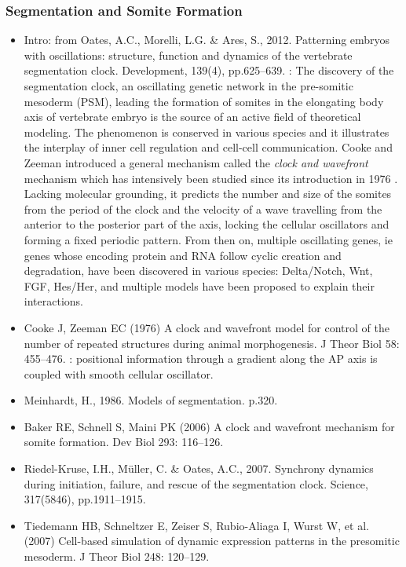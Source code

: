 \subsubsection{Segmentation and Somite Formation}
\begin{itemize}
	\item Intro: from Oates, A.C., Morelli, L.G. \& Ares, S., 2012. Patterning embryos with oscillations: structure, function and dynamics of the vertebrate segmentation clock. Development, 139(4), pp.625–639. \cite{Oates:2012kv}: The discovery of the segmentation clock, an oscillating genetic network in the pre-somitic mesoderm (PSM), leading the formation of somites in the elongating body axis of vertebrate embryo is the source of an active field of theoretical modeling. The phenomenon is conserved in various species and it illustrates the interplay of inner cell regulation and cell-cell communication. Cooke and Zeeman introduced a general mechanism called the \textit{clock and wavefront} mechanism which has intensively been studied since its introduction in 1976 \cite{Cooke:1976uf}. Lacking molecular grounding, it predicts the number and size of the somites from the period of the clock and the velocity of a wave travelling from the anterior to the posterior part of the axis, locking the cellular oscillators and forming a fixed periodic pattern. From then on, multiple oscillating genes, ie genes whose encoding protein and RNA follow cyclic creation and degradation, have been discovered in various species: Delta/Notch, Wnt, FGF, Hes/Her, and multiple models have been proposed to explain their interactions.
	\item    Cooke J, Zeeman EC (1976) A clock and wavefront model for control of the number of repeated structures during animal morphogenesis. J Theor Biol 58: 455–476. \cite{Cooke:1976uf}: positional information through a gradient along the AP axis is coupled with smooth cellular oscillator.  
	\item    Meinhardt, H., 1986. Models of segmentation. p.320. \cite{Bellairs:1986vo}
	\item    Baker RE, Schnell S, Maini PK (2006) A clock and wavefront mechanism for somite formation. Dev Biol 293: 116–126. \cite{Baker:2006dq}
	\item    Riedel-Kruse, I.H., Müller, C. \& Oates, A.C., 2007. Synchrony dynamics during initiation, failure, and rescue of the segmentation clock. Science, 317(5846), pp.1911–1915. \cite{RiedelKruse:2007hh}
	\item    Tiedemann HB, Schneltzer E, Zeiser S, Rubio-Aliaga I, Wurst W, et al. (2007) Cell-based simulation of dynamic expression patterns in the presomitic mesoderm. J Theor Biol 248: 120–129. \cite{Tiedemann:2007gv}

\end{itemize}

